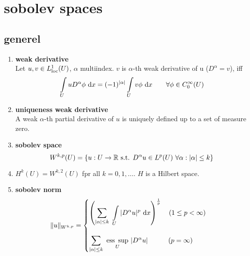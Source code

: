 \section{sobolev spaces}

\subsection{generel}

\begin{enumerate}[label=(\alph*)]
	\item \textbf{weak derivative}\\
	Let $u,v \in L^1_{\text{loc}}(U)$, $\alpha$ multiindex. $v$ is $\alpha$-th weak derivative of u ($D^{\alpha} = v$), iff
	\begin{equation*}
	\int \limits_U u D^{\alpha}\phi \text{ d} x = (-1)^{|\alpha|} \int \limits_U v\phi \text{ d} x \qquad \forall \phi \in C^\infty_0(U)
	\end{equation*}
	
	\item \textbf{uniqueness weak derivative}\\
	A weak  $\alpha$-th partial derivative of $u$ is uniquely defined up to a set of measure zero.
	
	\item \textbf{sobolev space}\\
	\begin{equation*}
		W^{k,p}(U) = \{ u: U \to \mathbb{R} \text{ s.t. } D^{\alpha}u \in L^p(U)\  \forall \alpha: |\alpha| \leq k \}
	\end{equation*}
	\item $H^k(U) = W^{k,2}(U)$ fpr all $k = 0,1,\dots$. $H$ is a Hilbert space.
	
	\item \textbf{sobolev norm}
	\begin{equation*}
		\|u\|_{W^{k,p}} = 
		\begin{cases}
		\left( \displaystyle \sum_{|\alpha|\leq k}\  \int \limits_U |D^{\alpha}u|^p  \text{ d} x \right)^{\frac{1}{p}} \quad (1 \leq p< \infty)\\
		\\
		\displaystyle \sum_{|\alpha|\leq k}\  \underset{U}{\text{ess }\sup}\  |D^{\alpha}u| \qquad \quad  (p = \infty)
		\end{cases}
	\end{equation*}
	\\
	\\
	\\
	\\
	

\end{enumerate}
